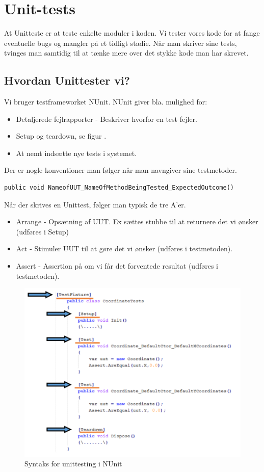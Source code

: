 \section{Unit-tests}
At Unitteste er at teste enkelte moduler i koden. Vi tester vores kode for at fange eventuelle bugs og mangler på et tidligt stadie. Når man skriver sine tests, tvinges man samtidig til at tænke mere over det stykke kode man har skrevet.

\subsection{Hvordan Unittester vi?}
Vi bruger testframeworket NUnit. NUnit giver bla. mulighed for:
\begin{itemize}
	\item Detaljerede fejlrapporter - Beskriver hvorfor en test fejler.
	\item Setup og teardown, se figur .
	\item At nemt indsætte nye tests i systemet.
\end{itemize}

Der er nogle konventioner man følger når man navngiver sine testmetoder.

\begin{lstlisting}
public void NameofUUT_NameOfMethodBeingTested_ExpectedOutcome()
\end{lstlisting}

Når der skrives en Unittest, følger man typisk de tre A'er.

\begin{itemize}
	\item Arrange - Opsætning af UUT. Ex sættes stubbe til at returnere det vi ønsker (udføres i Setup)
	\item Act - Stimuler UUT til at gøre det vi ønsker (udføres i testmetoden).
	\item Assert - Assertion på om vi får det forventede resultat (udføres i testmetoden).
\end{itemize}

\begin{figure}
\centering
\includegraphics[width=0.7\linewidth]{figs/testFixture.PNG}
\caption{Syntaks for unittesting i NUnit}
\label{fig:testFixture}
\end{figure}


